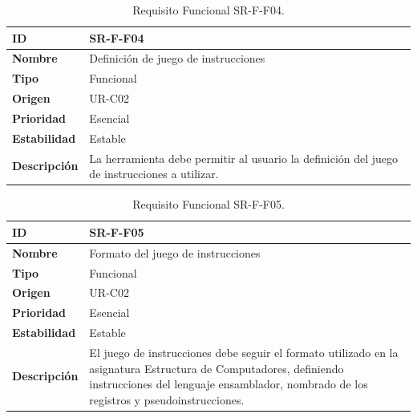 \begin{center}
\begin{table}[htbp]
\centering
\begin{tabular}{@{}p{2.5cm} p{9cm}@{}} 
\toprule
\textbf{ID} 				& SR-F-F04 \\
\midrule
\textbf{Nombre} 			& Definición de juego de instrucciones \\
\midrule
\textbf{Tipo} 			& Funcional \\
\midrule
\textbf{Origen} 			& UR-C02 \\
\midrule
\textbf{Prioridad}		& Esencial \\
\midrule
\textbf{Estabilidad} 		& Estable \\
\midrule
\textbf{Descripción} 	& La herramienta debe permitir al usuario la definición del juego de instrucciones a utilizar.\\
\bottomrule
\end{tabular}
\caption{Requisito Funcional SR-F-F04.}
\label{tab:srff04}
\end{table}
\end{center}

\begin{center}
\begin{table}[htbp]
\centering
\begin{tabular}{@{}p{2.5cm} p{9cm}@{}} 
\toprule
\textbf{ID} 				& SR-F-F05 \\
\midrule
\textbf{Nombre} 			& Formato del juego de instrucciones\\
\midrule
\textbf{Tipo} 			& Funcional \\
\midrule
\textbf{Origen} 			& UR-C02 \\
\midrule
\textbf{Prioridad}		& Esencial \\
\midrule
\textbf{Estabilidad} 		& Estable \\
\midrule
\textbf{Descripción} 	& El juego de instrucciones debe seguir el formato utilizado en la asignatura Estructura de Computadores, definiendo instrucciones del lenguaje ensamblador, nombrado de los registros y pseudoinstrucciones. \\
\bottomrule
\end{tabular}
\caption{Requisito Funcional SR-F-F05.}
\label{tab:srff05}
\end{table}
\end{center}

